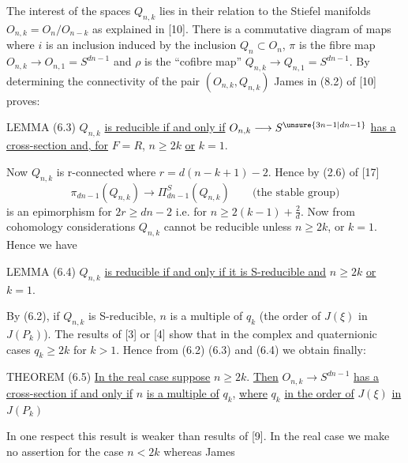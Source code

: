 The interest of the spaces $Q_{n,k}$ lies in their relation to the
Stiefel manifolds $O_{n,k}=O_n/O_{n-k}$ as explained in [10]. There is
a commutative diagram of maps
where $i$ is an inclusion induced by the inclusion $Q_n\subset O_n$,
$\pi$ is the fibre map $O_{n,k}\longrightarrow O_{n,1}=S^{dn-1}$ and
$\rho$ is the ``cofibre map'' $Q_{n,k}\longrightarrow Q_{n,1}=S^{dn-1}$.
By determining the connectivity of the pair $(O_{n,k},Q_{n,k})$ James
in (8.2) of [10] proves:

LEMMA (6.3) $Q_{n,k}$ \uline{is reducible if and only if}
$O_{n,k}\longrightarrow S^{\unsure{3n-1|dn-1}}$ \uline{has a cross-section
and, for} $F=R$, $n\geq2k$ \uline{or} $k=1$.

Now $Q_{n,k}$ is r-connected where $r=d(n-k+1)-2$. Hence by (2.6) of [17]
\[
\pi_{dn-1}(Q_{n,k})\longrightarrow\Pi^S_{dn-1}(Q_{n,k})
\qquad\text{(the stable group)}
\]
is an epimorphism for $2r\geq dn-2$ i.e. for
$n\geq2(k-1)+\frac2d$. Now from cohomology considerations $Q_{n,k}$
cannot be reducible unless $n\geq2k$, or $k=1$. Hence we have

LEMMA (6.4) $Q_{n,k}$ \uline{is reducible if and only if it is
S-reducible and} $n\geq2k$ \uline{or} $k=1$.

By (6.2), if $Q_{n,k}$ is S-reducible, $n$ is a multiple of $q_k$
(the order of $J(\xi)$ in $J(P_k)$). The results of [3] or [4] show that
in the complex and quaternionic cases $q_k\geq2k$ for $k>1$. Hence from
(6.2) (6.3) and (6.4) we obtain finally:

THEOREM (6.5) \uline{In the real case suppose} $n\geq2k$. \uline{Then}
$O_{n,k}\longrightarrow S^{dn-1}$ \uline{has a cross-section if and
only if} $n$ \uline{is a multiple of} $q_k$, \uline{where} $q_k$
\uline{in the order of} $J(\xi)$ \uline{in} $J(P_k)$

In one respect this result is weaker than results of [9]. In the real
case we make no assertion for the case $n<2k$ whereas James


